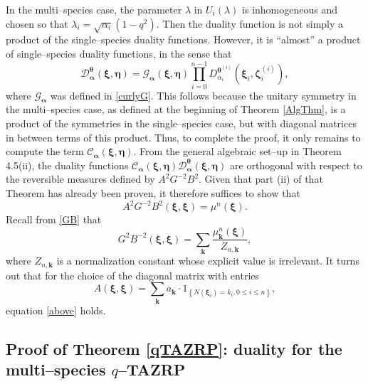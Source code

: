 \documentclass{ximera}
\begin{document}
In the multi--species case, the parameter $\lambda$ in $U_i(\lambda)$ is inhomogeneous and chosen so that $\lambda_i = \sqrt{\alpha_i}(1-q^2)$. 
Then the duality function is not simply a product of the single--species duality functions. However, it is ``almost'' a product of single--species duality functions, in the sense that 
$$
\mathcal{D}^{\boldsymbol\theta}_{\boldsymbol{\alpha}}(\boldsymbol\xi, \boldsymbol\eta) = \mathcal{G}_{\boldsymbol{\alpha}}(\boldsymbol\xi,\boldsymbol\eta)\prod_{i=0}^{n-1}D^{  \boldsymbol{\theta}^{(i)} }_{\alpha_i}(\boldsymbol\xi_i, \boldsymbol\zeta^{(i)}_i),
$$
where $\mathcal{G}_{\boldsymbol{\alpha}}$ was defined in \eqref{curlyG}. This follows because the unitary symmetry in the multi--species case, as defined at the beginning of Theorem \ref{AlgThm}, is a product of the symmetries in the single--species case, but with diagonal matrices in between terms of this product. Thus, to complete the proof, it only remains to compute the term $\mathcal{C}_{\boldsymbol{\alpha}}(\boldsymbol\xi, \boldsymbol\eta)$.
From the general algebraic set--up in Theorem 4.5(ii), the duality functions $\mathcal{C}_{\boldsymbol{\alpha}}(\boldsymbol\xi, \boldsymbol\eta)\mathcal{D}^{\boldsymbol\theta}_{\boldsymbol{\alpha}}(\boldsymbol\xi, \boldsymbol\eta)$ are orthogonal with respect to the reversible measures defined by $A^2G^{-2}B^2$. Given that part (ii) of that Theorem has already been proven, it therefore suffices to show that
\begin{equation}\label{above}
A^2G^{-2}B^2(\boldsymbol{\xi},\boldsymbol{\xi}) = \mu^n(\boldsymbol{\xi}).
\end{equation}
Recall from \eqref{GB} that 
\begin{equation*}
G^2B^{-2}(\boldsymbol\xi,\boldsymbol\xi) = \sum_{\boldsymbol k} \frac{\mu_{\boldsymbol k}^n(\boldsymbol\xi)}{Z_{n,\boldsymbol k}},
\end{equation*}
where $Z_{n, \boldsymbol{k}}$ is a normalization constant whose explicit value is irrelevant. It turns out that for the choice of the diagonal matrix with entries
$$
A(\boldsymbol\xi, \boldsymbol\xi) = \sum_{\boldsymbol k} a_{\boldsymbol k} \cdot 1_{\left\{N\left(\boldsymbol\xi_{i}\right)=k_{i}, 0 \leq i \leq n\right\}},
$$
equation \eqref{above} holds.



\subsection{Proof of Theorem \ref{qTAZRP}: duality for the multi--species $q$--TAZRP}
\end{document}
